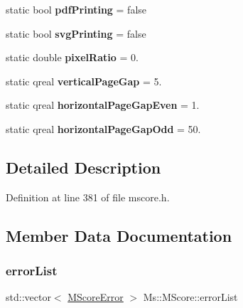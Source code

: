 \begin{DoxyCompactItemize}
\mbox{\label{class_ms_1_1_m_score_a3555026e4d8dc5d2fed51058d373c24f}} 
static bool {\bfseries pdf\+Printing} = false
\item 
\mbox{\label{class_ms_1_1_m_score_a081bc830656be3f433757f73f11f9928}} 
static bool {\bfseries svg\+Printing} = false
\item 
\mbox{\label{class_ms_1_1_m_score_ade52f115d27cf5954552facec70c5903}} 
static double {\bfseries pixel\+Ratio} = 0.
\item 
\mbox{\label{class_ms_1_1_m_score_a2d1e149be3385c5540ef31af5d4fb20e}} 
static qreal {\bfseries vertical\+Page\+Gap} = 5.
\item 
\mbox{\label{class_ms_1_1_m_score_ac9d042a7decd57dbcea04544594b33c1}} 
static qreal {\bfseries horizontal\+Page\+Gap\+Even} = 1.
\item 
\mbox{\label{class_ms_1_1_m_score_a4869cc8207f7c0ad6772120a1ec78c56}} 
static qreal {\bfseries horizontal\+Page\+Gap\+Odd} = 50.
\end{DoxyCompactItemize}


\subsection{Detailed Description}


Definition at line 381 of file mscore.\+h.



\subsection{Member Data Documentation}
\mbox{\label{class_ms_1_1_m_score_a8ccedbbf51d98edfd8fd4c142716f1d4}} 
\subsubsection{\texorpdfstring{error\+List}{errorList}}
{\footnotesize\ttfamily std\+::vector$<$ \hyperlink{struct_ms_1_1_m_score_error}{M\+Score\+Error} $>$ Ms\+::\+M\+Score\+::error\+List\hspace{0.3cm}{\ttfamily [static]}}

